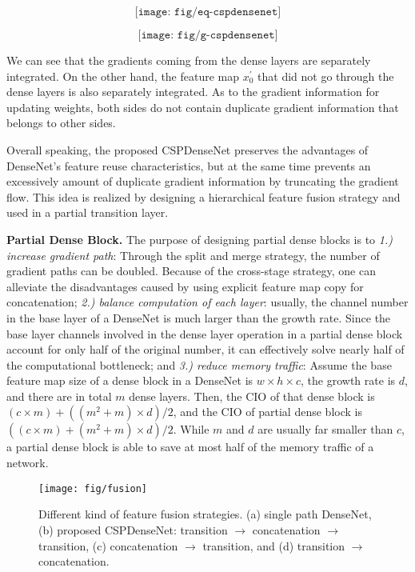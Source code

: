 \documentclass{article}
\begin{document}
\begin{equation}
\label{equation:cspdensenet}
\texttt{[image: fig/eq-cspdensenet]}
\end{equation}

\begin{equation}
\label{equation:cspdensenetg}
\texttt{[image: fig/g-cspdensenet]}
\end{equation}

We can see that the gradients coming from the dense layers are separately integrated.  On the other hand, the feature map $x_{0}^{'}$ that did not go through the dense layers is also separately integrated.  As to the gradient information for updating weights, both sides do not contain duplicate gradient information that belongs to other sides.  

Overall speaking, the proposed CSPDenseNet preserves the advantages of DenseNet's feature reuse characteristics, but at the same time prevents an excessively amount of duplicate gradient information by truncating the gradient flow.  This idea is realized by designing a hierarchical feature fusion strategy and used in a partial transition layer.

{\bf Partial Dense Block.} The purpose of designing partial dense blocks is to \textit{1.) increase gradient path}: Through the split and merge strategy, the number of gradient paths can be doubled.  Because of the cross-stage strategy, one can alleviate the disadvantages caused by using explicit feature map copy for concatenation; \textit{2.) balance computation of each layer}: usually, the channel number in the base layer of a DenseNet is much larger than the growth rate.  Since the base layer channels involved in the dense layer operation in a partial dense block account for only half of the original number, it can effectively solve nearly half of the computational bottleneck; and \textit{3.) reduce memory traffic}: Assume the base feature map size of a dense block in a DenseNet is $w \times h \times c$, the growth rate is $d$, and there are in total $m$ dense layers.  Then, the CIO of that dense block is $(c \times m) + ((m^{2}+m) \times d)/2$, and the CIO of partial dense block is $((c \times m) + (m^{2}+m) \times d)/2$.  While $m$ and $d$ are usually far smaller than $c$, a partial dense block is able to save at most half of the memory traffic of a network.

\begin{figure}[h]
	\begin{center}
		\texttt{[image: fig/fusion]}
	\end{center}
	\caption{Different kind of feature fusion strategies.  (a) single path DenseNet, (b) proposed CSPDenseNet: transition $\rightarrow$ concatenation $\rightarrow$ transition, (c) concatenation $\rightarrow$ transition, and (d) transition $\rightarrow$ concatenation.  }
	\label{fig:fusion}
\end{figure}
\end{document}
